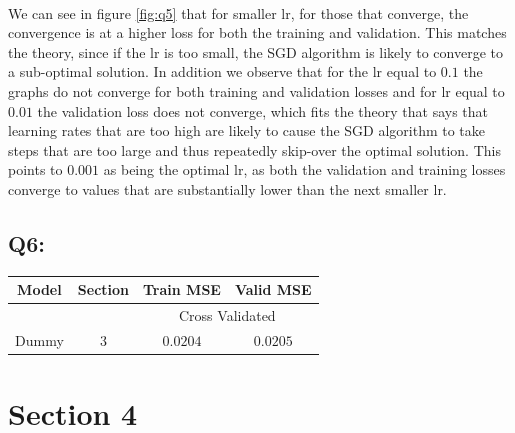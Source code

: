 \documentclass{article}
\begin{document}
    \paragraph*{}
    We can see in figure \ref{fig:q5} that for smaller lr, for those that converge, the convergence is at a higher loss for both the training and validation. This matches the theory, since if the lr is too small, the SGD algorithm is likely to converge to a sub-optimal solution. In addition we observe that for the lr equal to $0.1$ the graphs do not converge for both training and validation losses and for lr equal to $0.01$ the validation loss does not converge, which fits the theory that says that learning rates that are too high are likely to cause the SGD algorithm to take steps that are too large and thus repeatedly skip-over the optimal solution. This points to $0.001$ as being the optimal lr, as both the validation and training losses converge to values that are substantially lower than the next smaller lr.
\subsection*{Q6:}
    \begin{center}
        \begin{tabular}{|c|c|c|c|}
            \hline
            \rowcolor{gray!60}
            Model & Section & Train MSE & Valid MSE\\ \hline
            \rowcolor{gray!20}
            ~&~ & \multicolumn{2}{c|}{Cross Validated}\\ \hline
            Dummy & 3 & $0.0204$ & $0.0205$\\ \hline
        \end{tabular}
    \end{center}
\section*{Section 4}
\end{document}
